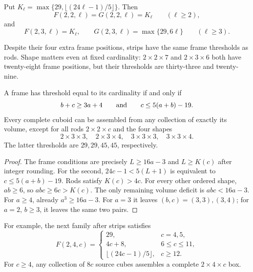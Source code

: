 \begin{corollary}\label{thm:thin}
Put $K_\ell=\max\{29,\lfloor(24\ell-1)/5\rfloor\}$. Then
\[
 F(2,2,\ell)=G(2,2,\ell)=K_\ell \qquad(\ell\ge2),
\]
and
\[
 F(2,3,\ell)=K_\ell,\qquad G(2,3,\ell)=\max\{29,6\ell\}
 \qquad(\ell\ge3).
\]
\end{corollary}
Despite their four extra frame positions, strips have the same frame
thresholds as rods. Shape matters even at fixed cardinality:
$2\times2\times7$ and $2\times3\times6$ both have twenty-eight frame
positions, but their thresholds are thirty-three and twenty-nine.

\begin{corollary}\label{cor:cuboid-volume}
A frame has threshold equal to its cardinality if and only if
\[
 b+c\ge3a+4\qquad\hbox{and}\qquad c\le5(a+b)-19.
\]
Every complete cuboid can be assembled from any collection of exactly
its volume, except for all rods $2\times2\times c$ and the four shapes
\[
 2\times3\times3,\quad2\times3\times4,\quad
 3\times3\times3,\quad3\times3\times4.
\]
The latter thresholds are $29,29,45,45$, respectively.
\end{corollary}
\begin{proof}
The frame conditions are precisely $L\ge16a-3$ and $L\ge K(c)$ after
integer rounding. For the second,
$24c-1<5(L+1)$ is equivalent to $c\le5(a+b)-19$.
Rods satisfy $K(c)>4c$. For every other ordered shape, $ab\ge6$, so
$abc\ge6c>K(c)$. The only remaining volume deficit is $abc<16a-3$.
For $a\ge4$, already $a^3\ge16a-3$. For $a=3$ it leaves
$(b,c)=(3,3),(3,4)$; for $a=2$, $b\ge3$, it leaves the same two pairs.
\end{proof}

For example, the next family after strips satisfies
\[
 F(2,4,c)=
 \begin{cases}
 29,&c=4,5,\\
 4c+8,&6\le c\le11,\\
 \lfloor(24c-1)/5\rfloor,&c\ge12.
 \end{cases}
\]
For $c\ge4$, any collection of $8c$ source cubes assembles a complete
$2\times4\times c$ box.
